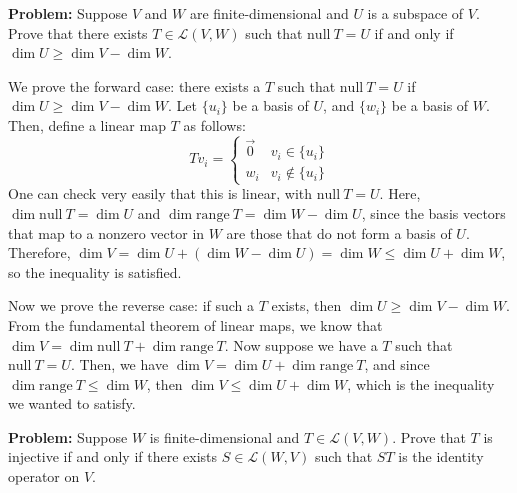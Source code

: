 \documentclass[10pt]{article}
\newcommand{\range}{\mathrm{range \ }}
\renewcommand{\null}{\mathrm{null \ }}
\newenvironment{problem}{\textbf{Problem:}}{}
\begin{document}
	\begin{problem}
		Suppose \( V \) and \( W \) are finite-dimensional and \( U \) is a subspace of \( V \). Prove that 
		there exists \( T \in \mathcal L(V, W) \) such that \( \null T = U \) if and only if 
		\( \dim U \ge  \dim V - \dim W \). 
	\end{problem}
	

	\begin{solution}
		We prove the forward case: there exists a \( T \) such that \( \null T = U \) if 
		\( \dim U \ge \dim V - \dim W \). Let \( \{u_i \} \) be a basis of \( U \), and \( \{ w_i \} \) be a basis 
		of \( W \). Then, define a linear map \( T \) as follows:
		\[
		Tv_i = \begin{cases}
			\vec 0 & v_i \in \{u_i\} \\
			w_i & v_i \not \in \{u_i\} 
		\end{cases}
		\] 
		One can check very easily that this is linear, with \( \null T = U \). Here, \( \dim \null T = \dim U\)
		and \( \dim \range T = \dim W - \dim U \), since the basis vectors that map to a nonzero vector in \( W \) 
		are those that do not form a basis of \( U \). Therefore, \( \dim V = \dim U + (\dim W - \dim U) = \dim W
		\le \dim U + \dim W\), so the inequality is satisfied. 


		Now we prove the reverse case: if such a \( T \) exists, then \( \dim U \ge \dim V - \dim W \). 
		From the fundamental theorem of linear maps, we know that 
		\( \dim V = \dim \null T + \dim \range T \). Now suppose we have a \( T \) such that \( \null T = U \). 
		Then, we have \( \dim V = \dim U + \dim \range T \), and since \( \dim \range T \le \dim W \), then 
		\( \dim V \le  \dim U + \dim W  \), which is the inequality we wanted to satisfy. 
	\end{solution}

	\begin{problem}
		Suppose \( W \) is finite-dimensional and \( T \in \mathcal L(V, W) \). Prove that \( T \) is 
		injective if and only if there exists \( S \in \mathcal L(W, V)  \) such that \( ST \) is the identity 
		operator on \( V \).

	\end{problem}
\end{document}
